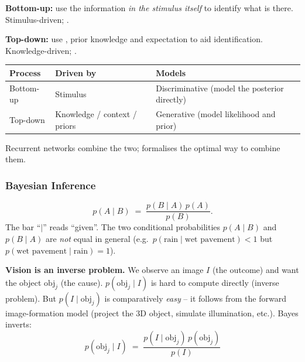 \separator

\begin{defbox}
\textbf{Bottom-up:} use the information \emph{in the stimulus itself} to identify what is there. Stimulus-driven; .

\textbf{Top-down:} use , prior knowledge and expectation to aid identification. Knowledge-driven; .
\end{defbox}

\begin{center}
\renewcommand{\arraystretch}{1.3}
\begin{tabular}{@{} l l l @{}}
\toprule
\textbf{Process} & \textbf{Driven by} & \textbf{Models} \\
\midrule
Bottom-up & Stimulus & Discriminative (model the posterior directly) \\
Top-down  & Knowledge / context / priors & Generative (model likelihood and prior) \\
\bottomrule
\end{tabular}
\end{center}

Recurrent networks combine the two;  formalises the optimal way to combine them.

\bigseparator

\subsubsection{Bayesian Inference}

\begin{defbox}
\[
p(A \mid B) \;=\; \frac{p(B \mid A)\, p(A)}{p(B)}.
\]
The bar ``$\mid$'' reads ``given''. The two conditional probabilities $p(A\mid B)$ and $p(B\mid A)$ are \emph{not} equal in general (e.g.\ $p(\text{rain}\mid\text{wet pavement}) < 1$ but $p(\text{wet pavement}\mid\text{rain}) = 1$).
\end{defbox}

\textbf{Vision is an inverse problem.} We observe an image $I$ (the outcome) and want the object $\text{obj}_j$ (the cause). $p(\text{obj}_j \mid I)$ is hard to compute directly (inverse problem). But $p(I \mid \text{obj}_j)$ is comparatively \emph{easy} -- it follows from the forward image-formation model (project the 3D object, simulate illumination, etc.). Bayes inverts:
\[
\boxed{\,p(\text{obj}_j \mid I) \;=\; \frac{p(I \mid \text{obj}_j)\, p(\text{obj}_j)}{p(I)}\,}
\]


